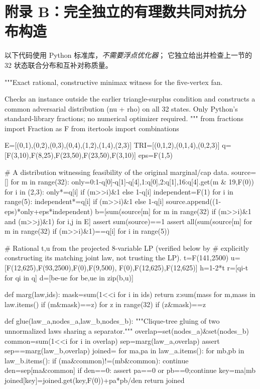 \documentclass[11pt,a4paper]{ctexart}
\theoremstyle{remark}\newtheorem{remark}[theorem]{说明}
\begin{document}
\section*{附录 B：完全独立的有理数共同对抗分布构造}
以下代码使用 Python 标准库，\emph{不需要浮点优化器}；
它独立给出并检查上一节的 32 状态联合分布和互补对称质量。
\begin{CodeListing}
"""Exact rational, constructive minimax witness for the five-vertex fan.

Checks an instance outside the earlier triangle-surplus condition and
constructs a common adversarial distribution (nu + rho) on all 32 states.
Only Python's standard-library fractions; no numerical optimizer required.
"""
from fractions import Fraction as F
from itertools import combinations

E=[(0,1),(0,2),(0,3),(0,4),(1,2),(1,4),(2,3)]
TRI=[(0,1,2),(0,1,4),(0,2,3)]
q=[F(3,10),F(8,25),F(23,50),F(23,50),F(3,10)]
eps=F(1,5)

# A distribution witnessing feasibility of the original marginal/cap data.
source=[]
for m in range(32):
    only={0:1-q[0]-q[1]-q[4],1:q[0],2:q[1],16:q[4]}.get(m & 19,F(0))
    for i in (2,3): only*=q[i] if (m>>i)&1 else 1-q[i]
    independent=F(1)
    for i in range(5): independent*=q[i] if (m>>i)&1 else 1-q[i]
    source.append((1-eps)*only+eps*independent)
b=[sum(source[m] for m in range(32) if (m>>i)&1 and (m>>j)&1)
   for i,j in E]
assert sum(source)==1
assert all(sum(source[m] for m in range(32) if (m>>i)&1)==q[i]
           for i in range(5))

# Rational t,u from the projected 8-variable LP (verified below by
# explicitly constructing its matching joint law, not trusting the LP).
t=F(141,2500)
u=[F(12,625),F(93,2500),F(0),F(9,500),
   F(0),F(12,625),F(12,625)]
h=1-2*t
r=[qi-t for qi in q]
d=[be-ue for be,ue in zip(b,u)]

def marg(law,ids):
    mask=sum(1<<i for i in ids)
    return {z:sum(mass for m,mass in law.items() if (m&mask)==z)
            for z in range(32) if (z&mask)==z}

def glue(law_a,nodes_a,law_b,nodes_b):
    """Clique-tree gluing of two unnormalized laws sharing a separator."""
    overlap=set(nodes_a)&set(nodes_b)
    common=sum(1<<i for i in overlap)
    sep=marg(law_a,overlap)
    assert sep==marg(law_b,overlap)
    joined={}
    for ma,pa in law_a.items():
        for mb,pb in law_b.items():
            if (ma&common)!=(mb&common): continue
            den=sep[ma&common]
            if den==0: assert pa==0 or pb==0;continue
            key=ma|mb
            joined[key]=joined.get(key,F(0))+pa*pb/den
    return joined


\end{CodeListing}
\end{document}
